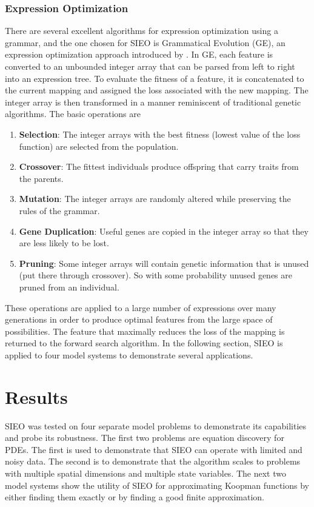 \documentclass{article}
\begin{document}
\subsubsection{Expression Optimization}
There are several excellent algorithms for expression optimization using a grammar, and the one chosen for SIEO is Grammatical Evolution (GE), an expression optimization approach introduced by \citet{ryan1998grammatical}. In GE, each feature is converted to an unbounded integer array that can be parsed from left to right into an expression tree. To evaluate the fitness of a feature, it is concatenated to the current mapping and assigned the loss associated with the new mapping. The integer array is then transformed in a manner reminiscent of traditional genetic algorithms. The basic operations are
\begin{enumerate}
\item \textbf{Selection}: The integer arrays with the best fitness (lowest value of the loss function) are selected from the population.
\item \textbf{Crossover}: The fittest individuals produce offspring that carry traits from the parents.
\item \textbf{Mutation}: The integer arrays are randomly altered while preserving the rules of the grammar.
\item \textbf{Gene Duplication}: Useful genes are copied in the integer array so that they are less likely to be lost.
\item \textbf{Pruning}: Some integer arrays will contain genetic information that is unused (put there through crossover). So with some probability unused genes are pruned from an individual.
\end{enumerate}

These operations are applied to a large number of expressions over many generations in order to produce optimal features from the large space of possibilities. The feature that maximally reduces the loss of the mapping is returned to the forward search algorithm. In the following section, SIEO is applied to four model systems to demonstrate several applications.

\section{Results}
\label{results}
SIEO was tested on four separate model problems to demonstrate its capabilities and probe its robustness. The first two problems are equation discovery for PDEs. The first is used to demonstrate that SIEO can operate with limited and noisy data. The second is to demonstrate that the algorithm scales to problems with multiple spatial dimensions and multiple state variables. The next two model systems show the utility of SIEO for approximating Koopman functions by either finding them exactly or by finding a good finite approximation.
\end{document}
